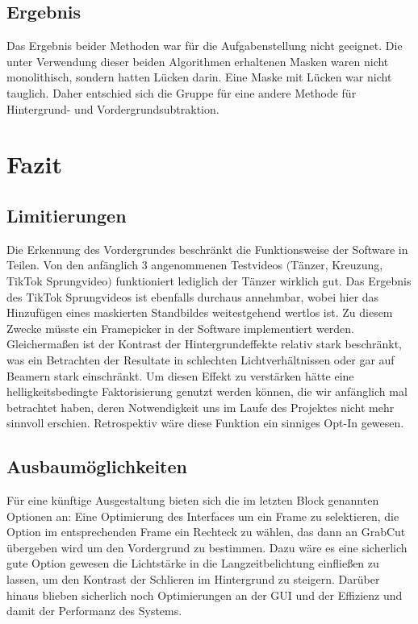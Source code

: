 \documentclass[12pt]{scrartcl}
\begin{document}
\subsection{Ergebnis}
Das Ergebnis beider Methoden war f\"ur die Aufgabenstellung nicht geeignet. Die unter Verwendung dieser beiden Algorithmen erhaltenen Masken waren nicht monolithisch, sondern hatten L\"ucken darin. Eine Maske mit L\"ucken war nicht tauglich.
Daher entschied sich die Gruppe f\"ur eine andere Methode f\"ur Hintergrund- und Vordergrundsubtraktion.\\






\section{Fazit}
\subsection{Limitierungen}
Die Erkennung des Vordergrundes beschr\"ankt die Funktionsweise der Software in Teilen. Von den anf\"anglich 3 angenommenen Testvideos
$ ( $T\"anzer, Kreuzung, TikTok Sprungvideo$ ) $ funktioniert lediglich der T\"anzer wirklich gut. Das Ergebnis des TikTok Sprungvideos ist
ebenfalls durchaus annehmbar, wobei hier das Hinzuf\"ugen eines maskierten Standbildes weitestgehend wertlos ist. Zu diesem Zwecke m\"usste ein Framepicker in der Software implementiert werden. Gleicherma{\ss}en ist der Kontrast der Hintergrundeffekte relativ stark beschr\"ankt, was ein Betrachten der Resultate in schlechten Lichtverh\"altnissen oder gar auf Beamern stark einschr\"ankt. Um diesen Effekt zu verst\"arken h\"atte eine helligkeitsbedingte Faktorisierung genutzt werden k\"onnen, die wir anf\"anglich mal betrachtet haben, deren Notwendigkeit uns im Laufe des Projektes nicht mehr sinnvoll erschien. Retrospektiv w\"are diese Funktion ein sinniges Opt-In gewesen.
\subsection{Ausbaum\"oglichkeiten}
F\"ur eine k\"unftige Ausgestaltung bieten sich die im letzten Block genannten Optionen an: Eine Optimierung des Interfaces um ein Frame zu selektieren, die Option im entsprechenden Frame ein Rechteck zu w\"ahlen, das dann an GrabCut \"ubergeben wird um den Vordergrund zu bestimmen. Dazu w\"are es eine sicherlich gute Option gewesen die Lichtst\"arke in die Langzeitbelichtung einflie{\ss}en zu lassen, um den Kontrast der Schlieren im Hintergrund zu steigern. Darüber hinaus blieben sicherlich noch Optimierungen an der GUI und der Effizienz und damit der Performanz des Systems.
\end{document}
